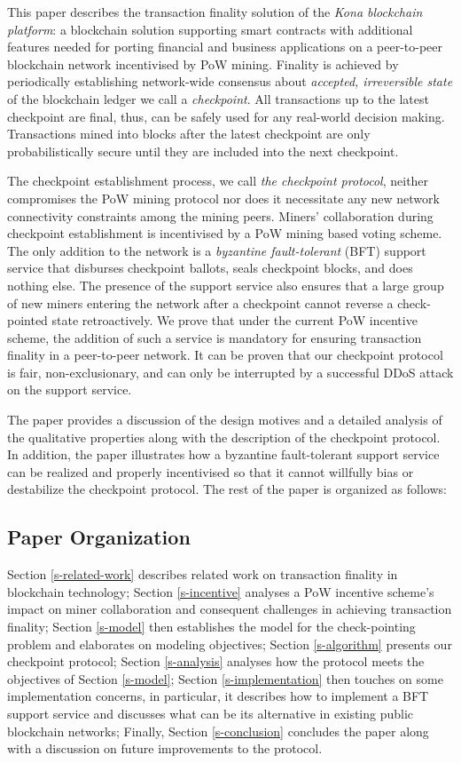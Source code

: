 This paper describes the transaction finality solution of the \textit{Kona blockchain platform}: a blockchain solution supporting smart contracts with additional features needed for porting financial and business applications on a peer-to-peer blockchain network incentivised by PoW mining. Finality is achieved by periodically establishing network-wide consensus about \textit{accepted, irreversible state} of the blockchain ledger we call a \textit{checkpoint}. All transactions up to the latest checkpoint are final, thus, can be safely used for any real-world decision making. Transactions mined into blocks after the latest checkpoint are only probabilistically secure until they are included into the next checkpoint. 

The checkpoint establishment process, we call \textit{the checkpoint protocol}, neither compromises the PoW mining protocol nor does it necessitate any new network connectivity constraints among the mining peers. Miners' collaboration during checkpoint establishment is incentivised by a PoW mining based voting scheme. The only addition to the network is a \textit{byzantine fault-tolerant} (BFT) \cite{Lamport:1982:BGP:357172.357176} support service that disburses checkpoint ballots, seals checkpoint blocks, and does nothing else. The presence of the support service also ensures that a large group of new miners entering the network after a checkpoint cannot reverse a check-pointed state retroactively. We prove that under the current PoW incentive scheme, the addition of such a service is mandatory for ensuring transaction finality in a peer-to-peer network. It can be proven that our checkpoint protocol is fair, non-exclusionary, and can only be interrupted by a successful DDoS attack \cite{Yu:2013:DDS:2556385} on the support service.          

The paper provides a discussion of the design motives and a detailed analysis of the qualitative properties along with the description of the checkpoint protocol. In addition, the paper illustrates how a byzantine fault-tolerant support service can be realized and properly incentivised so that it cannot willfully bias or destabilize the checkpoint protocol. The rest of the paper is organized as follows:

\subsection{Paper Organization}
Section \ref{s-related-work} describes related work on transaction finality in blockchain technology; Section \ref{s-incentive} analyses a PoW incentive scheme's impact on miner collaboration and consequent challenges in achieving transaction finality; Section \ref{s-model} then establishes the model for the check-pointing problem and elaborates on modeling objectives; Section \ref{s-algorithm} presents our checkpoint protocol; Section \ref{s-analysis} analyses how the protocol meets the objectives of Section \ref{s-model}; Section \ref{s-implementation} then touches on some implementation concerns, in particular, it describes how to implement a BFT support service and discusses what can be its alternative in existing public blockchain networks; Finally, Section \ref{s-conclusion} concludes the paper along with a discussion on future improvements to the protocol.  
